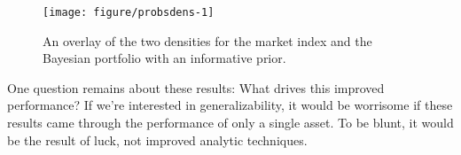 \documentclass[a4paper]{article}\usepackage[]{graphicx}\usepackage[]{color}
\newenvironment{knitrout}{}{} %
\begin{document}
\begin{knitrout}
\color{fgcolor}\begin{figure}
\texttt{[image: figure/probsdens-1]} \caption[An overlay of the two densities for the market index and the Bayesian portfolio with an informative prior]{An overlay of the two densities for the market index and the Bayesian portfolio with an informative prior.\label{fig:probsdens}}
\end{figure}


\end{knitrout}

One question remains about these results: What drives this improved performance? If we're interested in generalizability, it would be worrisome if these results came through the performance of only a single asset. To be blunt, it would be the result of luck, not improved analytic techniques.

\begin{table}[ht]
\centering
{}
\caption{Mean asset contributions to 5,000 simulated portfolio returns for the five portfolios examined in this project. The final three rows refer to portfolios constructed using Bayesian estimates of the parameters.} 
\label{tab:contmeans}
\end{table}
\end{document}

